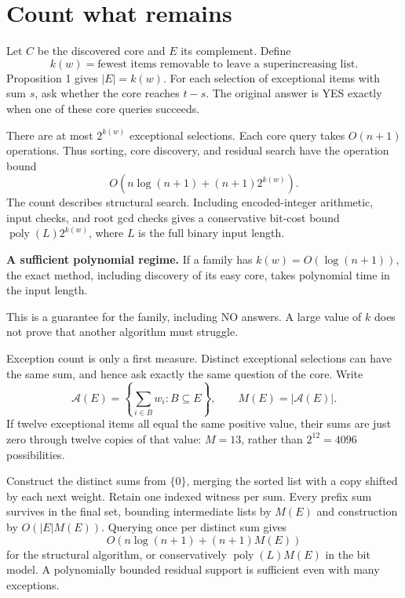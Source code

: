 \documentclass[10pt,english]{article}
\begin{document}
\section{Count what remains}
Let \(C\) be the discovered core and \(E\) its complement. Define
\[
k(w)=\text{fewest items removable to leave a superincreasing list}.
\]
Proposition 1 gives \(|E|=k(w)\). For each selection of exceptional items with sum \(s\), ask whether the core reaches \(t-s\). The original answer is YES exactly when one of these core queries succeeds.

There are at most \(2^{k(w)}\) exceptional selections. Each core query takes \(O(n+1)\) operations. Thus sorting, core discovery, and residual search have the operation bound
\[
O\!\left(n\log(n+1)+(n+1)2^{k(w)}\right).
\]
The count describes structural search. Including encoded-integer arithmetic, input checks, and root gcd checks gives a conservative bit-cost bound \(\operatorname{poly}(L)2^{k(w)}\), where \(L\) is the full binary input length.

\begin{tcolorbox}[accentbox]
\textbf{A sufficient polynomial regime.} If a family has \(k(w)=O(\log(n+1))\), the exact method, including discovery of its easy core, takes polynomial time in the input length.
\end{tcolorbox}

This is a guarantee for the family, including NO answers. A large value of \(k\) does not prove that another algorithm must struggle.

Exception count is only a first measure. Distinct exceptional selections can have the same sum, and hence ask exactly the same question of the core. Write
\[
\mathcal A(E)=\left\{\sum_{i\in B}w_i:B\subseteq E\right\},
\qquad M(E)=|\mathcal A(E)|.
\]
If twelve exceptional items all equal the same positive value, their sums are just zero through twelve copies of that value: \(M=13\), rather than \(2^{12}=4096\) possibilities.

Construct the distinct sums from \(\{0\}\), merging the sorted list with a copy shifted by each next weight. Retain one indexed witness per sum. Every prefix sum survives in the final set, bounding intermediate lists by \(M(E)\) and construction by \(O(|E|M(E))\). Querying once per distinct sum gives
\[
O\!\left(n\log(n+1)+(n+1)M(E)\right)
\]
for the structural algorithm, or conservatively \(\operatorname{poly}(L)M(E)\) in the bit model. A polynomially bounded residual support is sufficient even with many exceptions.
\end{document}
